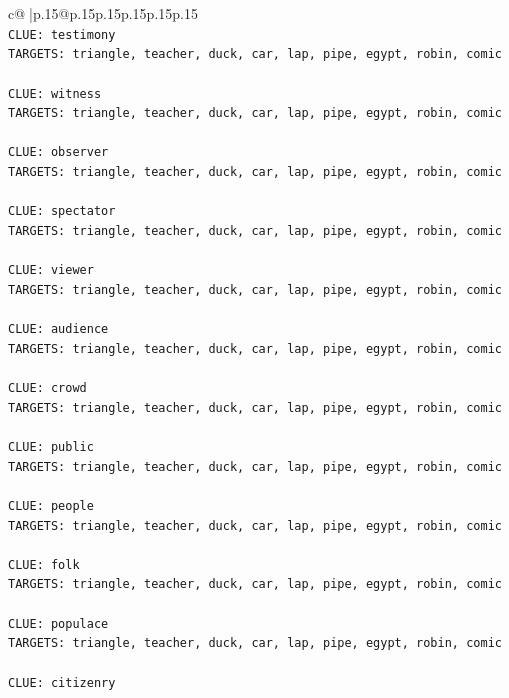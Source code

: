\documentclass{article}
\begin{document}
{\begin{supertabular}{c@{$\;$}|p{.15\linewidth}@{}p{.15\linewidth}p{.15\linewidth}p{.15\linewidth}p{.15\linewidth}p{.15\linewidth}}
{{{\\ 
\texttt{CLUE: testimony} \\
\texttt{TARGETS: triangle, teacher, duck, car, lap, pipe, egypt, robin, comic} \\
\\ 
\texttt{CLUE: witness} \\
\texttt{TARGETS: triangle, teacher, duck, car, lap, pipe, egypt, robin, comic} \\
\\ 
\texttt{CLUE: observer} \\
\texttt{TARGETS: triangle, teacher, duck, car, lap, pipe, egypt, robin, comic} \\
\\ 
\texttt{CLUE: spectator} \\
\texttt{TARGETS: triangle, teacher, duck, car, lap, pipe, egypt, robin, comic} \\
\\ 
\texttt{CLUE: viewer} \\
\texttt{TARGETS: triangle, teacher, duck, car, lap, pipe, egypt, robin, comic} \\
\\ 
\texttt{CLUE: audience} \\
\texttt{TARGETS: triangle, teacher, duck, car, lap, pipe, egypt, robin, comic} \\
\\ 
\texttt{CLUE: crowd} \\
\texttt{TARGETS: triangle, teacher, duck, car, lap, pipe, egypt, robin, comic} \\
\\ 
\texttt{CLUE: public} \\
\texttt{TARGETS: triangle, teacher, duck, car, lap, pipe, egypt, robin, comic} \\
\\ 
\texttt{CLUE: people} \\
\texttt{TARGETS: triangle, teacher, duck, car, lap, pipe, egypt, robin, comic} \\
\\ 
\texttt{CLUE: folk} \\
\texttt{TARGETS: triangle, teacher, duck, car, lap, pipe, egypt, robin, comic} \\
\\ 
\texttt{CLUE: populace} \\
\texttt{TARGETS: triangle, teacher, duck, car, lap, pipe, egypt, robin, comic} \\
\\ 
\texttt{CLUE: citizenry} \\
}}}
\end{supertabular}}
\end{document}
